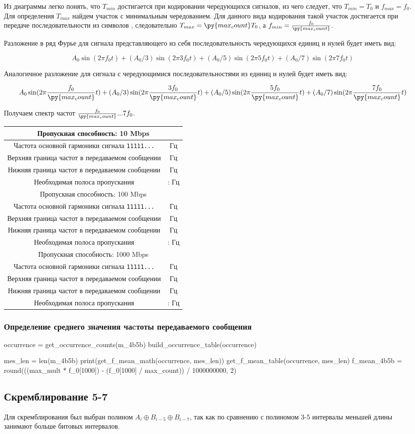 \documentclass[12pt, a4paper]{article}
\newcommand{\bandwidthEntry}[2]{
  \hline
  \multicolumn{2}{|c|}{Пропускная способность: #1 Mbps} \\
  \hline
  Частота основной гармоники сигнала \texttt{11111...} & \py{int(f_0[#1] * #2)} Гц \\
  Верхняя граница частот в передаваемом сообщении & \py{int(max_mult * f_0[#1])} Гц \\
  Нижняя граница частот в передаваемом сообщении & \py{int(f_0[#1] / max_count)} Гц \\
  Необходимая полоса пропускания & \py{int(f_0[#1] / max_count)} : \py{int(max_mult * f_0[#1])} Гц \\
}
\begin{document}
Из диаграммы легко понять, что $T_{min}$ достигается при кодировании чередующихся
сигналов, из чего следует, что $T_{min} = T_0$ и $f_{max} = f_0$. Для определения
$T_{max}$ найдем участок с минимальным чередованием. Для данного вида кодирования
такой участок достигается при передаче последовательности из 
символов \texttt{},
следовательно $T_{max} = \py{max_count} T_0$, а $f_{min} = \frac{f_0}{\py{max_count}}$.

Разложение в ряд Фурье для сигнала представляющего из себя последовательность
чередующихся единиц и нулей будет иметь вид:

$$A_0 \sin(2 \pi f_0 t) + (A_0 / 3) \sin(2 \pi 3 f_0 t) +
  (A_0 / 5) \sin(2 \pi 5 f_0 t) + (A_0 / 7) \sin(2 \pi 7 f_0 t)$$

Аналогичное разложение для сигнала с чередующимися последовательностями из
 единиц и нулей будет иметь вид:

$$A_0 \sin(2 \pi \frac{f_0}{\py{max_count}} t) + (A_0 / 3) \sin(2 \pi \frac{3 f_0}{\py{max_count}} t) +
  (A_0 / 5) \sin(2 \pi \frac{5 f_0}{\py{max_count}} t) + (A_0 / 7) \sin(2 \pi \frac{7 f_0}{\py{max_count}} t)$$

Получаем спектр частот $\frac{f_0}{\py{max_count}}...7 f_0$.

\begin{tabular}{| c | c |}
  \bandwidthEntry{10}{0}
  \bandwidthEntry{100}{0}
  \bandwidthEntry{1000}{0}
  \hline
\end{tabular}

\subsubsection*{Определение среднего значения чаcтоты передаваемого сообщения}

\begin{pycode}
occurrence = get_occurrence_counts(m_4b5b)
build_occurrence_table(occurrence)

mes_len = len(m_4b5b)
print(get_f_mean_math(occurrence, mes_len))
get_f_mean_table(occurrence, mes_len)
f_mean_4b5b = round(((max_mult * f_0[1000]) - (f_0[1000] / max_count)) / 1000000000, 2)
\end{pycode}

\subsection{Скремблирование 5-7}

Для скремблирования был выбран полином $A_i \oplus B_{i-5} \oplus B_{i-7}$,
так как по сравнению с полиномом 3-5 интервалы меньшей длины занимают больше
битовых интервалов.
\end{document}

